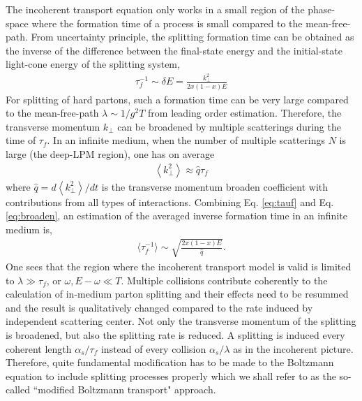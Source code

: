 \documentclass[aps, prc, reprint, amsmath, groupedaddress, nofootinbib]{revtex4-1}
\begin{document}
The incoherent transport equation only works in a small region of the phase-space where the formation time of a process is small compared to the mean-free-path.
From uncertainty principle, the splitting formation time can be obtained as the inverse of the difference between the final-state energy and the initial-state light-cone energy of the splitting system,
\begin{eqnarray}
\tau_f^{-1} \sim \delta E = \frac{k_\perp^2}{2x(1-x)E} 
\label{eq:tauf}
\end{eqnarray}
For splitting of hard partons, such a formation time can be very large compared to the mean-free-path $\lambda \sim 1/g^2T$ from leading order estimation.
Therefore, the transverse momentum $k_\perp$ can be broadened by multiple scatterings during the time of $\tau_f$.
In an infinite medium, when the number of multiple scatterings $N$ is large (the deep-LPM region), one has on average
\begin{eqnarray}
\left\langle k_\perp^2 \right\rangle \approx \hat{q} \tau_f \label{eq:broaden}
\end{eqnarray}
where $\hat{q} = d \left\langle k_\perp^2 \right\rangle / dt$ is the transverse momentum broaden coefficient with contributions from all types of interactions.
Combining Eq. \ref{eq:tauf} and Eq. \ref{eq:broaden}, an estimation of the averaged inverse formation time in an infinite medium is,
\begin{eqnarray}
\langle \tau_f^{-1} \rangle \sim \sqrt{\frac{2x(1-x)E}{\hat{q}}}.
\label{eq:tauf-sf}
\end{eqnarray}
One sees that the region where the incoherent transport model is valid is limited to $\lambda \gg \tau_f$, or $\omega, E-\omega \ll T$.
Multiple collisions contribute coherently to the calculation of in-medium parton splitting and their effects need to be resummed and the result is qualitatively changed compared to the rate induced by independent scattering center.
Not only the transverse momentum of the splitting is broadened, but also the splitting rate is reduced. 
A splitting is induced every coherent length $\alpha_s/\tau_f$ instead of every collision $\alpha_s/\lambda$ as in the incoherent picture.
Therefore, quite fundamental modification has to be made to the Boltzmann equation to include splitting processes properly which we shall refer to as the so-called ``modified Boltzmann transport" approach.
\end{document}
